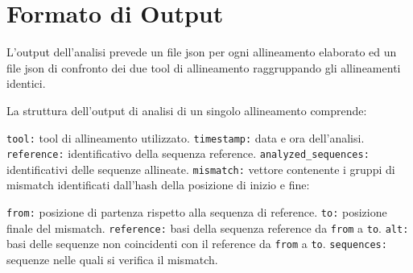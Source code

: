 \documentclass[11pt,italian]{article}
\makeatletter
\newcommand*{\lstitem}[1][]{%
  \setbox0\hbox\bgroup
    \patchcmd{\lst@InlineM}{\@empty}{\@empty\egroup\item[\usebox0]\leavevmode\ignorespaces}{}{}%
    \lstinline[#1]%
}
\makeatother
\begin{document}
% \item \lstinline{parse(self, filename, reference=None, list=[]}:  legge il file in ingresso e restituisce il file in input suddiviso in: reference, sequenze, lunghezza sequenze. svolge la sua funzione sfruttando il metodo: \lstinline{parseLines(self, lines)}




\section{Formato di Output}
L'output dell'analisi prevede un file json per ogni allineamento elaborato ed un file json di confronto dei due tool di allineamento raggruppando gli allineamenti identici.

La struttura dell'output di analisi di un singolo allineamento comprende:
\begin{description}
  \lstitem{tool:} tool di allineamento utilizzato.
  \lstitem{timestamp:} data e ora dell'analisi.
  \lstitem{reference:} identificativo della sequenza reference.
  \lstitem{analyzed_sequences:} identificativi delle sequenze allineate.
  \lstitem{mismatch:} vettore contenente i gruppi di mismatch identificati dall'hash della posizione di inizio e fine:
  \begin{description}
    \lstitem{from:} posizione di partenza rispetto alla sequenza di reference.
    \lstitem{to:} posizione finale del mismatch.
    \lstitem{reference:} basi della sequenza reference da \lstinline{from} a \lstinline{to}.
    \lstitem{alt:} basi delle sequenze non coincidenti con il reference da \lstinline{from} a \lstinline{to}.
    \lstitem{sequences:} sequenze nelle quali si verifica il mismatch.
  \end{description}
\end{description}
\end{document}

